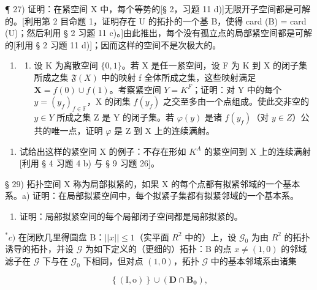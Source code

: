 ¶ 27) 证明：在紧空间 X 中，每个等势的{[}§ 2，习题 11 d){]}无限开子空间都是可解的。{[}利用第 2 目命题 1，证明存在 U 的拓扑的一个基 B，使得 card (B) = card (U)；然后利用 § 2 习题 11 c)。{]}由此推出，每个没有孤立点的局部紧空间都是可解的{[}利用 § 2 习题 11 d){]}；因而这样的空间不是次极大的。

\begin{enumerate}
\def\labelenumi{\arabic{enumi})}
\setcounter{enumi}{27}
\tightlist
\item
  \begin{enumerate}
  \def\labelenumii{\alph{enumii})}
  \tightlist
  \item
    设 K 为离散空间 \(\{0,1\}\)。若 X 是任一紧空间，设 F 为 K 到 X 的闭子集所成之集 \(\mathfrak{F}(X)\) 中的映射 f 全体所成之集，这些映射满足 \(\mathbf{X}=f(0)\cup f(1)\)。考察紧空间 \(Y=K^{F}\)；证明：对 Y 中的每个 \(y=(y_{f})_{f\in\mathbb{F}}\)，X 的闭集 \(f(y_{f})\) 之交至多由一个点组成。使此交非空的 \(y\in Y\) 所成之集 Z 是 Y 的闭子集。若 \(\varphi(y)\) 是诸 \(f(y_{f})\)（对 \(y\in Z\)）公共的唯一点，证明 \(\varphi\) 是 Z 到 X 上的连续满射。
  \end{enumerate}
\end{enumerate}

\begin{enumerate}
\def\labelenumi{\alph{enumi})}
\setcounter{enumi}{1}
\tightlist
\item
  试给出这样的紧空间 X 的例子：不存在形如 \(K^{A}\) 的紧空间到 X 上的连续满射{[}利用 § 4 习题 4 b) 与 § 9 习题 26{]}。
\end{enumerate}

§ 29) 拓扑空间 X 称为局部拟紧的，如果 X 的每个点都有拟紧邻域的一个基本系。a) 证明：在局部拟紧空间中，每个拟紧子集都有拟紧邻域的一个基本系。

\begin{enumerate}
\def\labelenumi{\alph{enumi})}
\setcounter{enumi}{1}
\tightlist
\item
  证明：局部拟紧空间的每个局部闭子空间都是局部拟紧的。
\end{enumerate}

\(^{*}c)\) 在闭欧几里得圆盘 B：\(||x|| \leqslant 1\)（实平面 \(R^{2}\) 中的）上，设 \(\mathcal{G}_{0}\) 为由 \(R^{2}\) 的拓扑诱导的拓扑，并设 \(\mathcal{G}\) 为如下定义的（更细的）拓扑：B 的点 \(x \neq (1,0)\) 的邻域滤子在 \(\mathcal{G}\) 下与在 \(\mathcal{G}_{0}\) 下相同，但对点 \((1,0)\)，拓扑 \(\mathcal{G}\) 中的基本邻域系由诸集

\[
\left\{\left(\mathrm{I}, \mathrm{o}\right) \right\} \cup \left(\mathbf {D} \cap \mathbf {B} _ {\mathbf {0}}\right),
\]

